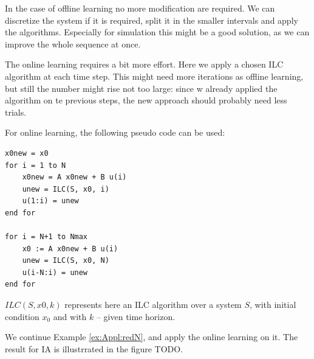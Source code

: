 In the case of offline learning no more modification are required. We can discretize the system if it is required, split it in the smaller intervals and apply the algorithms. Especially for simulation this might be a good solution, as we can improve the whole sequence at once. 

The online learning requires a bit more effort. Here we apply a chosen ILC algorithm at each time step. This might need more iterations as offline learning, but still the number might rise not too large: since w already applied the algorithm on te previous steps, the new approach should probably need less trials. 

For online learning, the following pseudo code can be used: 
\begin{lstlisting}
x0new = x0
for i = 1 to N 
	x0new = A x0new + B u(i)
	unew = ILC(S, x0, i)
	u(1:i) = unew
end for

for i = N+1 to Nmax
	x0 := A x0new + B u(i) 
	unew = ILC(S, x0, N)
	u(i-N:i) = unew
end for
\end{lstlisting}	

$ILC(S, x0, k)$
 represents here an ILC algorithm over a system $S$, with initial condition $x_0$ and with $k$ -- given time horizon. 


\begin{exam}
	We continue Example \ref{ex:Appl:redN}, and apply the online learning on it. 
	The result for IA is illustrrated in the figure TODO. 
\end{exam}
	
	
	
	